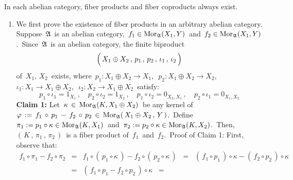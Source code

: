 \vskip 0.5cm
\begin{proposition}
\label{FiberProductFiberCoproductExistInAbelianCategories}
\mbox{}
\vskip 0.1cm
\noindent
In each abelian category,
fiber products and fiber coproducts always exist.
\end{proposition}
\proof
\begin{enumerate}
\item
	We first prove the existence of fiber products in an arbitrary abelian category.
	Suppose \,$\mathfrak{A}$\, is an abelian category,
	\,$f_{1} \in \textnormal{Mor}_{\mathfrak{A}}(X_{1},Y)$\,
	and
	\,$f_{2} \in \textnormal{Mor}_{\mathfrak{A}}(X_{1},Y)$.\,
	Since \,$\mathfrak{A}$\, is an abelian category, the finite {\color{red}biproduct}
	\begin{equation*}
	\left(\,
		X_{1} \overset{{\color{white}.}}{\oplus} X_{2}
		\,,\,
		p_{1}
		\,,\,
		p_{2}
		\,,\,
		\iota_{1}
		\,,\,
		\iota_{2}
		\,\right)
	\end{equation*}
	of \,$X_{1},\, X_{2}$\, exists, where
	\,$p_{1} : X_{1} \oplus X_{2} \longrightarrow X_{1}$,\,
	\,$p_{2} : X_{1} \oplus X_{2} \longrightarrow X_{2}$,\,
	\,$\iota_{1} : X_{1} \longrightarrow X_{1} \oplus X_{2}$,\,
	\,$\iota_{2} : X_{2} \longrightarrow X_{1} \oplus X_{2}$\,
	satisfy:
	\begin{equation*}
	p_{1} \circ \iota_{1} = 1_{X_{1}}\,,
	\quad
	p_{2} \circ \iota_{2} = 1_{X_{2}}\,,
	\quad
	p_{1} \circ \iota_{2} = 0_{X_{2},X_{1}}\,,
	\quad
	p_{2} \circ \iota_{1} = 0_{X_{1},X_{2}}
	\end{equation*}
	\vskip 0.3cm
	\noindent
	\textbf{Claim 1:}\quad
	Let \,$\kappa \,\in\, \textnormal{Mor}_{\mathfrak{A}}(K, X_{1}\oplus X_{2})$\,
	be any {\color{red}kernel of
	\,$\varphi\,:=\,f_{1}\,\circ\,p_{1}\,-\,f_{2}\,\circ\,p_{2}\,\in\,\textnormal{Mor}_{\mathfrak{A}}(\,X_{1} \oplus X_{2}\,,\,Y\,)$}.\,
	Define
	\,$\pi_{1} := p_{1} \circ \kappa \in \textnormal{Mor}_{\mathfrak{A}}(K,X_{1})$\,
	and
	\,$\pi_{2} := p_{2} \circ \kappa \in \textnormal{Mor}_{\mathfrak{A}}(K,X_{2})$.\,
	Then,
	\,$\left(\,K\,,\,\pi_{1}\,,\,\pi_{2}\,\right)$\,
	is a fiber product of
	\,$f_{1}$\,
	and
	\,$f_{2}$.\,
	\vskip 0.2cm
	\noindent
	Proof of Claim 1:\;\;
	First, observe that:
	\begin{eqnarray*}
	f_{1} \circ \pi_{1} - f_{2} \circ \pi_{2}
	& = &
		f_{1} \circ (\,p_{1} \circ \kappa\,) - f_{2} \circ (\,p_{2} \circ \kappa\,)
	\;\; = \;\;
		(\,f_{1} \circ p_{1}\,) \circ \kappa - (\,f_{2} \circ p_{2}\,) \circ \kappa
	\\
	& = &
		(\,f_{1} \circ p_{1} - f_{2} \circ p_{2}\,) \circ \kappa
	\;\; = \;\;

\end{eqnarray*}
\end{enumerate}
